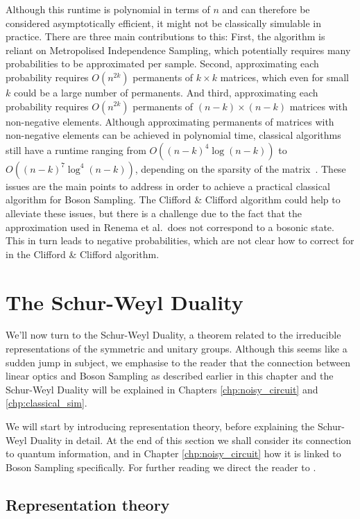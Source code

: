 Although this runtime is polynomial in terms of $n$ and can therefore be considered asymptotically efficient, it might not be classically simulable in practice. 
There are three main contributions to this: 
First, the algorithm is reliant on Metropolised Independence Sampling, which potentially requires many probabilities to be approximated per sample. 
Second, approximating each probability requires $O(n^{2k})$ permanents of $k\times k$ matrices, which even for small $k$ could be a large number of permanents. 
And third, approximating each probability requires $O(n^{2k})$ permanents of $(n-k)\times(n-k)$ matrices with non-negative elements. 
Although approximating permanents of matrices with non-negative elements can be achieved in polynomial time, classical algorithms still have a runtime ranging from $O((n-k)^4\log(n-k))$ to $O((n-k)^{7}\log^4(n-k))$, depending on the sparsity of the matrix~\cite{huber2008}. These issues are the main points to address in order to achieve a practical classical algorithm for Boson Sampling. The Clifford \& Clifford algorithm could help to alleviate these issues, but there is a challenge due to the fact that the approximation used in Renema et al.\ does not correspond to a bosonic state. 
This in turn leads to negative probabilities, which are not clear how to correct for in the Clifford \& Clifford algorithm.

\section{The Schur-Weyl Duality}
\label{sec:sw-duality}

We'll now turn to the Schur-Weyl Duality, a theorem related to the irreducible representations of the symmetric and unitary groups. Although this seems like a sudden jump in subject, we emphasise to the reader that the connection between linear optics and Boson Sampling as described earlier in this chapter and the Schur-Weyl Duality will be explained in Chapters \ref{chp:noisy_circuit} and \ref{chp:classical_sim}.

We will start by introducing representation theory, before explaining the Schur-Weyl Duality in detail. At the end of this section we shall consider its connection to quantum information, and in Chapter \ref{chp:noisy_circuit} how it is linked to Boson Sampling specifically. For further reading we direct the reader to \cite{fulton2004, harrow2005}.

\subsection{Representation theory}

